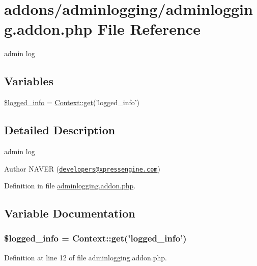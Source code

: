 \hypertarget{adminlogging_8addon_8php}{\section{addons/adminlogging/adminlogging.addon.\-php File Reference}
\label{adminlogging_8addon_8php}
}


admin log  


\subsection*{Variables}
\begin{DoxyCompactItemize}
\item 
\hyperlink{adminlogging_8addon_8php_a193c1593ceb216e9fb05b0bad01ebbc8}{\$logged\-\_\-info} = \hyperlink{classContext_a90ce25d65fe6c9778421cbb36ab3def5}{Context\-::get}('logged\-\_\-info')
\end{DoxyCompactItemize}


\subsection{Detailed Description}
admin log \begin{DoxyAuthor}{Author}
N\-A\-V\-E\-R (\href{mailto:developers@xpressengine.com}{\tt developers@xpressengine.\-com}) 
\end{DoxyAuthor}


Definition in file \hyperlink{adminlogging_8addon_8php_source}{adminlogging.\-addon.\-php}.



\subsection{Variable Documentation}
\hypertarget{adminlogging_8addon_8php_a193c1593ceb216e9fb05b0bad01ebbc8}{
\subsubsection[{\$logged\-\_\-info}]{\setlength{\rightskip}{0pt plus 5cm}\$logged\-\_\-info = {\bf Context\-::get}('logged\-\_\-info')}}\label{adminlogging_8addon_8php_a193c1593ceb216e9fb05b0bad01ebbc8}


Definition at line 12 of file adminlogging.\-addon.\-php.

